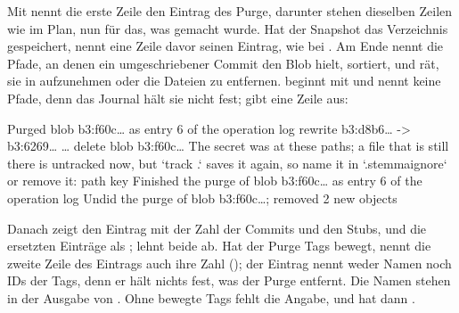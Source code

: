Mit  nennt die erste Zeile den Eintrag des Purge, darunter stehen dieselben
Zeilen wie im Plan, nun für das, was gemacht wurde. Hat der Snapshot das Verzeichnis
gespeichert, nennt eine Zeile davor seinen Eintrag, wie bei .
Am Ende nennt  die Pfade, an denen ein umgeschriebener Commit den Blob hielt,
sortiert, und rät, sie in  aufzunehmen oder die Dateien zu entfernen.
 beginnt mit  und nennt keine Pfade, denn das
Journal hält sie nicht fest;  gibt eine Zeile aus:

\starttyping
Purged blob b3:f60c… as entry 6 of the operation log
    rewrite b3:d8b6… -> b3:6269…
    …
    delete blob b3:f60c…
The secret was at these paths; a file that is still there is untracked now,
but `track .` saves it again, so name it in `.stemmaignore` or remove it:
    path key
Finished the purge of blob b3:f60c… as entry 6 of the operation log
Undid the purge of blob b3:f60c…; removed 2 new objects
\stoptyping

Danach zeigt  den Eintrag  mit der Zahl der Commits und den Stubs,
und die ersetzten Einträge als ;  lehnt beide ab.
Hat der Purge Tags bewegt, nennt die zweite Zeile des Eintrags auch ihre Zahl
(); der Eintrag nennt weder Namen noch IDs der Tags,
denn er hält nichts fest, was der Purge entfernt. Die Namen stehen in der Ausgabe von
. Ohne bewegte Tags fehlt die Angabe, und  hat
dann .

